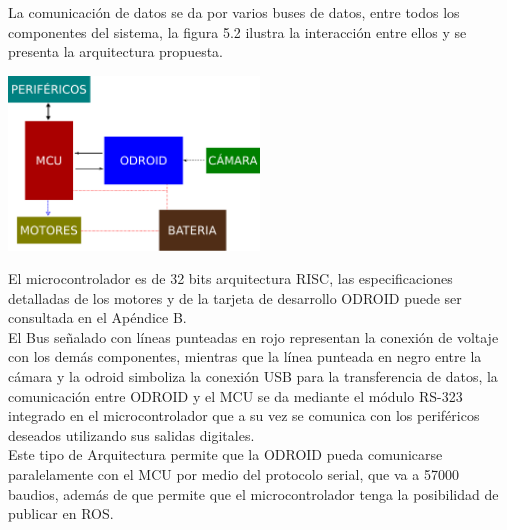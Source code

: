La comunicación de datos se da por varios buses de datos, entre todos los componentes del sistema, la figura 5.2 ilustra
la interacción entre ellos y se presenta la arquitectura propuesta.
\begin{center}
	\includegraphics[width=0.5\textwidth]{Contenido/Cuerpo/Capitulo5/Fig13.eps}
	\label{Fig1}
\end{center}
El microcontrolador es de 32 bits arquitectura RISC, las especificaciones detalladas de los motores y de la tarjeta de desarrollo
ODROID puede ser consultada en el Apéndice B.\\
El Bus señalado con líneas punteadas en rojo representan la conexión de voltaje con los demás componentes, mientras que la línea punteada en negro entre la cámara y la odroid
simboliza la conexión USB para la transferencia de datos, la comunicación entre ODROID y el MCU se da mediante el módulo RS-323 integrado en el microcontrolador que a su vez
se comunica con los periféricos deseados utilizando sus salidas digitales.\\
Este tipo de Arquitectura permite que la ODROID pueda comunicarse paralelamente con el MCU por medio del protocolo serial, que va
a 57000 baudios, además de que permite que el microcontrolador tenga la posibilidad de publicar en ROS.



